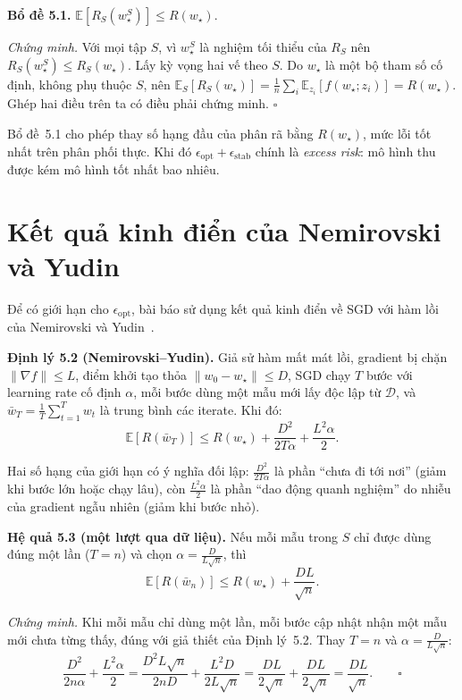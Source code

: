 \textbf{Bổ đề 5.1.} $\mathbb{E}\left[R_S(w_\star^S)\right] \le R(w_\star)$.

\textit{Chứng minh.} Với mọi tập $S$, vì $w_\star^S$ là nghiệm tối thiểu của $R_S$ nên $R_S(w_\star^S) \le R_S(w_\star)$. Lấy kỳ vọng hai vế theo $S$. Do $w_\star$ là một bộ tham số cố định, không phụ thuộc $S$, nên $\mathbb{E}_S[R_S(w_\star)] = \frac{1}{n}\sum_i \mathbb{E}_{z_i}[f(w_\star; z_i)] = R(w_\star)$. Ghép hai điều trên ta có điều phải chứng minh. $\square$

Bổ đề~5.1 cho phép thay số hạng đầu của phân rã bằng $R(w_\star)$, mức lỗi tốt nhất trên phân phối thực. Khi đó $\epsilon_{\mathrm{opt}} + \epsilon_{\mathrm{stab}}$ chính là \textit{excess risk}: mô hình thu được kém mô hình tốt nhất bao nhiêu.

\section{Kết quả kinh điển của Nemirovski và Yudin}
\label{sec:nemirovski}

Để có giới hạn cho $\epsilon_{\mathrm{opt}}$, bài báo sử dụng kết quả kinh điển về SGD với hàm lồi của Nemirovski và Yudin~\cite{nemirovski1983problem}.

\textbf{Định lý 5.2 (Nemirovski--Yudin).} Giả sử hàm mất mát lồi, gradient bị chặn $\|\nabla f\| \le L$, điểm khởi tạo thỏa $\|w_0 - w_\star\| \le D$, SGD chạy $T$ bước với learning rate cố định $\alpha$, mỗi bước dùng một mẫu mới lấy độc lập từ $\mathcal{D}$, và $\bar w_T = \frac{1}{T}\sum_{t=1}^{T} w_t$ là trung bình các iterate. Khi đó:
\[
\boxed{
\mathbb{E}\left[R(\bar w_T)\right] \le R(w_\star) + \frac{D^2}{2T\alpha} + \frac{L^2 \alpha}{2}.
}
\]

Hai số hạng của giới hạn có ý nghĩa đối lập: $\frac{D^2}{2T\alpha}$ là phần ``chưa đi tới nơi'' (giảm khi bước lớn hoặc chạy lâu), còn $\frac{L^2\alpha}{2}$ là phần ``dao động quanh nghiệm'' do nhiễu của gradient ngẫu nhiên (giảm khi bước nhỏ).

\textbf{Hệ quả 5.3 (một lượt qua dữ liệu).} Nếu mỗi mẫu trong $S$ chỉ được dùng đúng một lần ($T = n$) và chọn $\alpha = \frac{D}{L\sqrt{n}}$, thì
\[
\boxed{
\mathbb{E}\left[R(\bar w_n)\right] \le R(w_\star) + \frac{DL}{\sqrt{n}}.
}
\]

\textit{Chứng minh.} Khi mỗi mẫu chỉ dùng một lần, mỗi bước cập nhật nhận một mẫu mới chưa từng thấy, đúng với giả thiết của Định lý~5.2. Thay $T = n$ và $\alpha = \frac{D}{L\sqrt{n}}$:
\[
\frac{D^2}{2n\alpha} + \frac{L^2\alpha}{2} = \frac{D^2 L\sqrt{n}}{2nD} + \frac{L^2 D}{2L\sqrt{n}} = \frac{DL}{2\sqrt{n}} + \frac{DL}{2\sqrt{n}} = \frac{DL}{\sqrt{n}}. \qquad \square
\]

